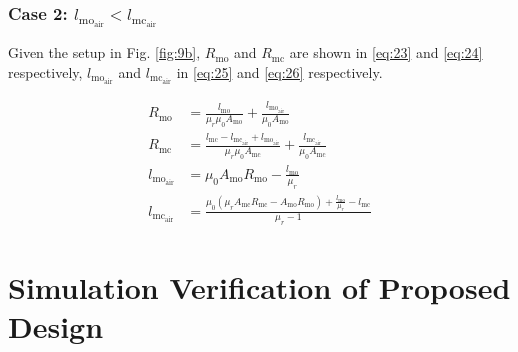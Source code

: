 \documentclass[lettersize,journal]{IEEEtran}
\begin{document}
\subsubsection*{\textup{Case 2: $l_{\mathrm{mo}_{\mathrm{air}}} < l_{\mathrm{mc}_{\mathrm{air}}}$}}
Given the setup in Fig. \ref{fig:9b}, $R_{\mathrm{mo}}$ and $R_{\mathrm{mc}}$ are shown in \eqref{eq:23} and \eqref{eq:24} respectively, $l_{\mathrm{mo}_{\mathrm{air}}}$ and $l_{\mathrm{mc}_{\mathrm{air}}}$ in \eqref{eq:25} and \eqref{eq:26} respectively.

\begin{align}
R_{\mathrm{mo}} &= \frac{l_{\mathrm{mo}}}{\mu_r \mu_0 A_{\mathrm{mo}}} + \frac{l_{\mathrm{mo}_{\mathrm{air}}}}{\mu_0 A_{\mathrm{mo}}} \label{eq:23}\\
R_{\mathrm{mc}} &= \frac{l_{\mathrm{mc}} - l_{\mathrm{mc}_{\mathrm{air}}} + l_{\mathrm{mo}_{\mathrm{air}}}}{\mu_r \mu_0 A_{\mathrm{mc}}} + \frac{l_{\mathrm{mc}_{\mathrm{air}}}}{\mu_0 A_{\mathrm{mc}}} \label{eq:24}\\
l_{\mathrm{mo}_{\mathrm{air}}} &= \mu_0 A_{\mathrm{mo}} R_{\mathrm{mo}} - \frac{l_{\mathrm{mo}}}{\mu_r} \label{eq:25}\\
l_{\mathrm{mc}_{\mathrm{air}}} &= \frac{\mu_0 (\mu_r A_{\mathrm{mc}} R_{\mathrm{mc}} - A_{\mathrm{mo}} R_{\mathrm{mo}}) + \frac{l_{\mathrm{mo}}}{\mu_r} - l_{\mathrm{mc}}}{\mu_r - 1} \label{eq:26}
\end{align}

\section{Simulation Verification of Proposed Design}
\end{document}

